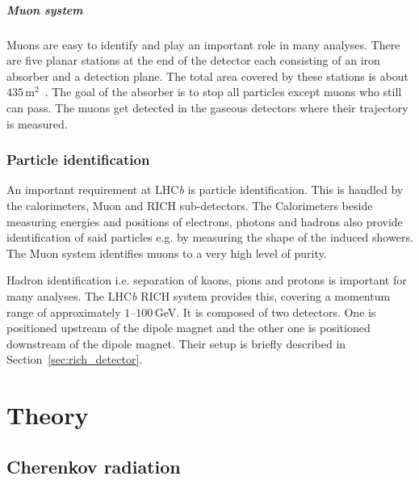 \documentclass[11pt]{scrreprt}
\begin{document}
\paragraph{Muon system}
Muons are easy to identify and play an important role in many analyses. There are five planar stations at the end of the detector each consisting of an iron absorber and a detection plane. The total area covered by these 
stations is about $435$\,m$^2$~\cite{Alves:2012ey}. The goal of the absorber is to stop all particles except muons who still can pass. The muons get detected 
in the gaseous detectors where their trajectory is measured.


\subsection{Particle identification} %
\label{sub:particle_identification}

An important requirement at LHC\textit{b} is particle identification. This is handled by the calorimeters, Muon and RICH sub-detectors. The 
Calorimeters beside measuring energies and positions of electrons, photons and hadrons also provide identification of said particles e.g.
by measuring the shape of the induced showers. The Muon system identifies muons to a very high level of purity.
       
Hadron identification i.e. separation of kaons, pions and protons is  important for many analyses. The LHC\textit{b} RICH system 
provides this, covering a momentum range of approximately $1$--$100$\,GeV. It is composed of two detectors. One is positioned upstream of the 
dipole magnet and the other one is positioned downstream of the dipole magnet. Their setup is briefly described in Section~\ref{sec:rich_detector}.



\chapter{Theory}

\section{Cherenkov radiation} %
\label{sec:cherenkov_radiation}
\end{document}
